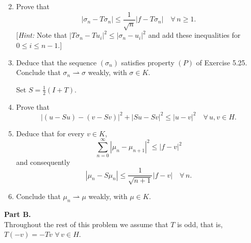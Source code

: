 \documentclass[12pt]{article}
\newcommand{\abs}[1]{\left|#1\right|}
\begin{document}
\begin{enumerate}
\setcounter{enumi}{1}
\item Prove that
\[
\abs{\sigma_n - T\sigma_n} \le \frac{1}{\sqrt{n}}\abs{f - T\sigma_n} \quad \forall\, n \ge 1.
\]
[\textit{Hint:} Note that $\abs{T\sigma_n - Tu_i}^2 \le \abs{\sigma_n - u_i}^2$ and add these inequalities for
$0 \le i \le n-1$.]
 
\item Deduce that the sequence $(\sigma_n)$ satisfies property $(P)$ of Exercise 5.25.
Conclude that $\sigma_n \rightharpoonup \sigma$ weakly, with $\sigma \in K$.
 
Set $S = \tfrac{1}{2}(I + T)$.
 
\item Prove that
\[
\abs{(u - Su) - (v - Sv)}^2 + \abs{Su - Sv}^2 \le \abs{u-v}^2 \quad \forall\, u, v \in H.
\]
 
\item Deduce that for every $v \in K$,
\[
\sum_{n=0}^\infty \abs{\mu_n - \mu_{n+1}}^2 \le \abs{f - v}^2
\]
and consequently
\[
\abs{\mu_n - S\mu_n} \le \frac{1}{\sqrt{n+1}}\abs{f - v} \quad \forall\, n.
\]
 
\item Conclude that $\mu_n \rightharpoonup \mu$ weakly, with $\mu \in K$.
\end{enumerate}
 
\noindent\textbf{Part B.}\\
Throughout the rest of this problem we assume that $T$ is odd, that is,
$T(-v) = -Tv$ $\forall\, v \in H$.
 
\end{document}
